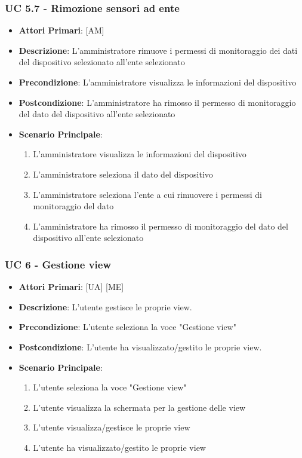			\subsubsection{UC 5.7 - Rimozione sensori ad ente}
			\begin{itemize}
				\item \textbf{Attori Primari}: [AM]
				\item \textbf{Descrizione}: L'amministratore rimuove i permessi di monitoraggio dei dati del dispositivo selezionato all'ente selezionato
				\item \textbf{Precondizione}: L'amministratore visualizza le informazioni del dispositivo
				\item \textbf{Postcondizione}: L'amministratore ha rimosso il permesso di monitoraggio del dato del dispositivo all'ente selezionato
				\item \textbf{Scenario Principale}:
				\begin{enumerate}
					\item{L'amministratore visualizza le informazioni del dispositivo}
					\item{L'amministratore seleziona il dato del dispositivo}
					\item{L'amministratore seleziona l'ente a cui rimuovere i permessi di monitoraggio del dato}
					\item{L'amministratore ha rimosso il permesso di monitoraggio del dato del dispositivo all'ente selezionato}
				\end{enumerate}
			\end{itemize}

		\subsubsection{UC 6 - Gestione view}
		\begin{itemize}
			\item \textbf{Attori Primari}: [UA] [ME]
			\item \textbf{Descrizione}: L'utente gestisce le proprie view.
			\item \textbf{Precondizione}: L'utente seleziona la voce "Gestione view"
			\item \textbf{Postcondizione}: L'utente ha visualizzato/gestito le proprie view.
			\item \textbf{Scenario Principale}:
			\begin{enumerate}
				\item{L'utente seleziona la voce "Gestione view"}
				\item{L'utente visualizza la schermata per la gestione delle view}
				\item{L'utente visualizza/gestisce le proprie view}
				\item{L'utente ha visualizzato/gestito le proprie view}
			\end{enumerate}	
		\end{itemize}

